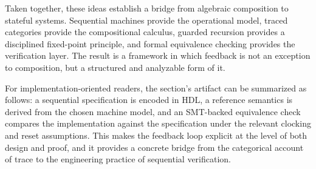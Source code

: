 \documentclass[11pt]{article}
\begin{document}
Taken together, these ideas establish a bridge from algebraic composition to stateful systems. Sequential machines provide the operational model, traced categories provide the compositional calculus, guarded recursion provides a disciplined fixed-point principle, and formal equivalence checking provides the verification layer. The result is a framework in which feedback is not an exception to composition, but a structured and analyzable form of it.

For implementation-oriented readers, the section's artifact can be summarized as follows: a sequential specification is encoded in HDL, a reference semantics is derived from the chosen machine model, and an SMT-backed equivalence check compares the implementation against the specification under the relevant clocking and reset assumptions. This makes the feedback loop explicit at the level of both design and proof, and it provides a concrete bridge from the categorical account of trace to the engineering practice of sequential verification.
\end{document}
